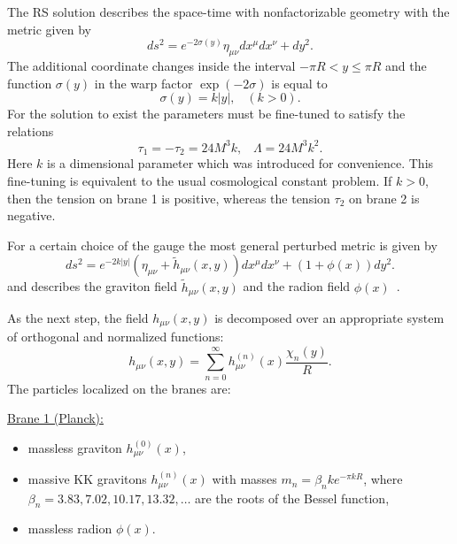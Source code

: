 \documentclass{cernyrep}
\begin{document}
The RS  solution describes the space-time with nonfactorizable
geometry with the metric  given by
\begin{equation}\label{RS:RS1}
ds^{2} = e^{-2\sigma (y)} \eta_{\mu \nu} dx^{\mu} dx^{\nu} +
dy^{2}.
\end{equation}
The additional coordinate changes inside the  interval $-\pi R < y
\leq \pi R$ and the function $\sigma (y)$ in the warp factor $\exp
(-2\sigma)$ is equal to
\begin{equation}\label{RS:sigma}
  \sigma (y) = k |y|, \; \; \; (k > 0).
\end{equation}
For the solution to exist the parameters must be fine-tuned to
satisfy the relations
\[
\tau_{1} = - \tau_{2} = 24 M^{3} k, \; \; \; \Lambda = 24 M^{3}
k^{2}.
\]
Here $k$ is a dimensional parameter which was introduced for
convenience. This fine-tuning is equivalent to the usual
cosmological constant problem. If $k > 0$, then  the tension on
brane 1 is positive, whereas the tension $\tau_{2}$ on brane 2 is
negative.

For a certain choice of the gauge the most general perturbed
metric is given by
\[
ds^{2} = e^{-2k|y|} \left( \eta_{\mu \nu} + \tilde{h}_{\mu
\nu}(x,y) \right) dx^{\mu} dx^{\nu} + (1 + \phi (x) ) dy^{2}.
\]
and describes the  graviton field $\tilde{h}_{\mu \nu}(x,y)$ and
the radion field $\phi (x)$~\cite{ADM}.

As the next step, the field $h_{\mu \nu}(x,y)$ is decomposed over an
appropriate system of orthogonal and normalized functions:
\begin{equation}\label{RS:decomp}
  h_{\mu \nu} (x,y) = \sum_{n=0}^{\infty} h_{\mu \nu}^{(n)}(x)
  \frac{\chi_{n}(y)}{R}.
\end{equation}
The particles localized on the branes are:\vspace{0.3cm}

\begin{minipage}[h]{7cm}
 \underline{Brane 1 (Planck):}
\begin{itemize}
  \item massless graviton $h_{\mu \nu}^{(0)}(x)$,
  \item massive KK gravitons $h_{\mu \nu}^{(n)}(x)$ with masses
  $m_{n}=\beta_{n} k e^{-\pi k R}$, where
  $\beta_{n} = 3.83, 7.02, 10.17, 13.32, \ldots$
  are the roots of the Bessel function,
  \item massless radion $\phi (x)$.
\end{itemize}
\end{minipage}\vspace{-4.3cm}
\end{document}
